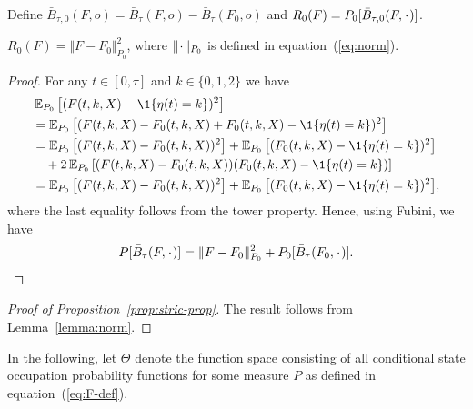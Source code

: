 \documentclass[a4,danish]{article}
\begin{document}
Define
\( \bar{B}_{\tau,0}(F, o) = \bar{B}_{\tau}(F, o) - \bar{B}_{\tau}(F_0, o) \) and
\( R_{0}(F) = P_0{[\bar{B}_{\tau,0}(F, \blank)]} \).
\begin{lemma}
  \label{lemma:norm}
  \( R_{0}(F) = \Vert F - F_0 \Vert_{P_0}^2 \), where \( \Vert \blank \Vert_{P_0}\) is defined
  in equation~(\ref{eq:norm}).
\end{lemma}
\begin{proof}
  For any \( t \in [0, \tau] \) and \( k\in \{0,1,2\} \) we have
  \begin{align*}
    & \E_{P_0}{\left[ (F(t, k, X) - \1{\{\eta(t) = k \}})^2 \right]}
    \\
    & =    \E_{P_0}{\left[ (F(t, k, X) - F_0(t, k, X) + F_0(t, k, X) - \1{\{\eta(t) = k
      \}})^2 \right]}
    \\
    & =    \E_{P_0}{\left[ (F(t, k, X) - F_0(t, k, X))^2\right]}
      + \E_{P_0}{\left[ (F_0(t, k, X) - \1{\{\eta(t) = k \}})^2\right]}
    \\
    & \quad
      + 2\E_{P_0}{\left[ (F(t, k, X) - F_0(t, k, X))(F_0(t, k, X) - \1{\{\eta(t) = k
      \}})\right]}
    \\
    & =    \E_{P_0}{\left[ (F(t, k, X) - F_0(t, k, X))^2\right]}
      + \E_{P_0}{\left[ (F_0(t, k, X) - \1{\{\eta(t) = k \}})^2\right]},
  \end{align*}
  where the last equality follows from the tower property. Hence, using Fubini,
  we have
  \begin{equation*}
    P{[\bar{B}_{\tau}(F, \blank)]}
    = \Vert F - F_0 \Vert_{P_0}^2 + P_0{[\bar{B}_{\tau}(F_0, \blank)]}. \qedhere
  \end{equation*}
\end{proof}

\begin{proof}[Proof of Proposition~\ref{prop:stric-prop}]
  The result follows from Lemma~\ref{lemma:norm}.
\end{proof}

In the following, let $\Theta$ denote the function space consisting of all
conditional state occupation probability functions for some measure \( P \) as
defined in equation~(\ref{eq:F-def}).
\end{document}

